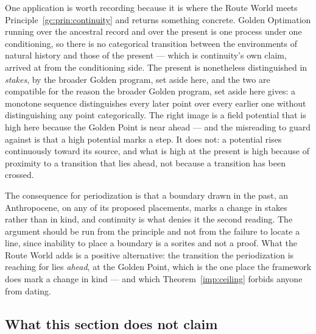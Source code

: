 \begin{remark}\label{gc:rem:periodization}
One application is worth recording because it is where the Route World
meets Principle~\ref{gc:prin:continuity} and returns something concrete. Golden Optimation running over the ancestral record and over the present
is one process under one conditioning, so there is no categorical
transition between the environments of natural history and those of the
present --- which is continuity's own claim, arrived at from the
conditioning side. The present is nonetheless distinguished in
\emph{stakes}, by the broader Golden program, set aside here, and the two are
compatible for the reason the broader Golden program, set aside here gives: a
monotone sequence distinguishes every later point over every earlier one
without distinguishing any point categorically. The right image is a
field potential that is high here because the Golden Point is near ahead
--- and the misreading to guard against is that a high potential marks a
step. It does not: a potential rises continuously toward its source, and
what is high at the present is high because of proximity to a transition
that lies ahead, not because a transition has been crossed.

The consequence for periodization is that a boundary drawn in the past, an Anthropocene, on any of its proposed placements, marks a
change in stakes rather than in kind, and continuity is what denies it
the second reading. The argument should be run from the principle and
not from the failure to locate a line, since inability to place a
boundary is a sorites and not a proof. What the Route World adds is a
positive alternative: the transition the periodization is reaching for
lies \emph{ahead}, at the Golden Point, which is the one place the
framework does mark a change in kind --- and which
Theorem~\ref{imp:ceiling} forbids anyone from dating.
\end{remark}



\subsection{What this section does not claim}\label{gr:sub:fence}

